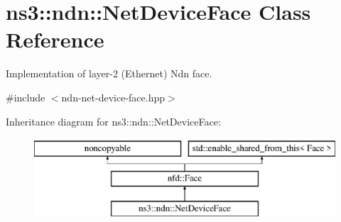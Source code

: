 \hypertarget{classns3_1_1ndn_1_1NetDeviceFace}{}\section{ns3\+:\+:ndn\+:\+:Net\+Device\+Face Class Reference}
\label{classns3_1_1ndn_1_1NetDeviceFace}


Implementation of layer-\/2 (Ethernet) Ndn face.  




{\ttfamily \#include $<$ndn-\/net-\/device-\/face.\+hpp$>$}

Inheritance diagram for ns3\+:\+:ndn\+:\+:Net\+Device\+Face\+:\begin{figure}[H]
\begin{center}
\leavevmode
\includegraphics[height=3.000000cm]{classns3_1_1ndn_1_1NetDeviceFace}
\end{center}
\end{figure}
